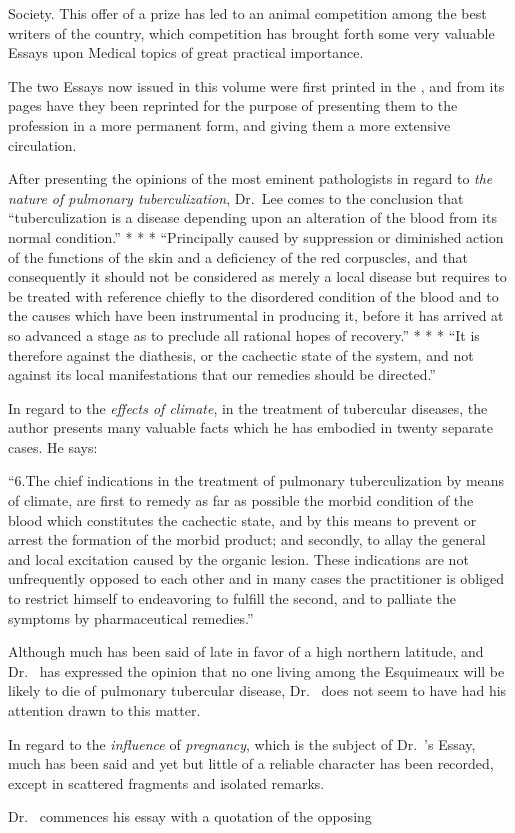 Society. This offer of a prize has led to an animal competition among
the best writers of the country, which competition has brought forth
some very valuable Essays upon Medical topics of great practical importance.

The two Essays now issued in this volume were first printed in the
, and from its pages have they
been reprinted for the purpose of presenting them to the profession in
a more permanent form, and giving them a more extensive circulation.

After presenting the opinions of the most eminent pathologists in
regard to \emph{the nature of pulmonary tuberculization}, Dr.~Lee comes to
the conclusion that ``tuberculization is a disease depending upon an
alteration of the blood from its normal condition.'' * * * ``Principally
caused by suppression or diminished action of the functions of the
skin and a deficiency of the red corpuscles, and that consequently it
should not be considered as merely a local disease but requires to be
treated with reference chiefly to the disordered condition of the blood
and to the causes which have been instrumental in producing it, before
it has arrived at so advanced a stage as to preclude all rational hopes
of recovery.'' * * * ``It is therefore against the diathesis, or the
cachectic state of the system, and not against its local manifestations
that our remedies should be directed.''

In regard to the \emph{effects of climate}, in the treatment of tubercular
diseases, the author presents many valuable facts which he has embodied
in twenty separate cases. He says:

``6.\quad{}The chief indications in the treatment of pulmonary tuberculization
by means of climate, are first to remedy as far as possible the
morbid condition of the blood which constitutes the cachectic state, and
by this means to prevent or arrest the formation of the morbid product;
and secondly, to allay the general and local excitation caused by
the organic lesion. These indications are not unfrequently opposed to
each other and in many cases the practitioner is obliged to restrict himself
to endeavoring to fulfill the second, and to palliate the symptoms
by pharmaceutical remedies.''

Although much has been said of late in favor of a high northern
latitude, and Dr.~ has expressed the opinion that no one living
among the Esquimeaux will be likely to die of pulmonary tubercular
disease, Dr.~ does not seem to have had his attention drawn to this
matter.

In regard to the \emph{influence} of \emph{pregnancy}, which is the subject of Dr.~'s
Essay, much has been said and yet but little of a reliable character
has been recorded, except in scattered fragments and isolated remarks.

Dr.~ commences his essay with a quotation of the opposing\endinput
